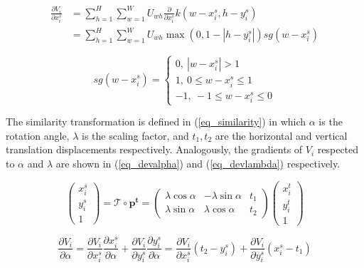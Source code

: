\documentclass[10pt,twocolumn,letterpaper]{article}
\begin{document}
	\begin{equation}\label{eq_devsrc}
	\begin{split}
	\frac{\partial V_i}{\partial x_i^s}
	&= \sum_{h=1}^{H} \sum_{w=1}^{W} U_{wh} \frac{\partial}{\partial x_i^s}k(w-x_i^s,h-y_i^s) \\
	&= \sum_{h=1}^{H} \sum_{w=1}^{W} U_{wh} \max(0,1-|h-y_i^s|) sg(w-x_i^s)
	\end{split}
	\end{equation}
	
	\begin{equation}\label{eq_devsgn}
	sg(w-x_i^s) = 	\left\{                 
	\begin{array}{lll}  
		0, \ |w-x_i^s|>1 \\ 
		1, \ 0 \leq w-x_i^s \leq 1 \\
		-1, \ -1 \leq w-x_i^s \leq 0
	\end{array}       
	\right. 
	\end{equation}

	The similarity transformation is defined in (\ref{eq_similarity}) in which $\alpha$ is the rotation angle, $\lambda$ is the scaling factor, and $t_1,t_2$ are the horizontal and vertical translation displacements respectively. Analogously, the gradients of $V_i$ respected to $\alpha$ and $\lambda$ are shown in (\ref{eq_devalpha}) and (\ref{eq_devlambda}) respectively.
	
	\begin{equation}\label{eq_similarity}
	\left(\begin{matrix}
	x^s_i\\y^s_i\\1
	\end{matrix} \right) = 
	\mathcal{T}\circ \mathbf{p^t} = 
	\left( \begin{matrix}
	\lambda \cos\alpha & -\lambda \sin\alpha & t_1\\
	\lambda \sin\alpha & \lambda \cos\alpha & t_2
	\end{matrix} \right)
	\left(\begin{matrix}
	x^t_i\\y^t_i\\1
	\end{matrix} \right)
	\end{equation}

	\begin{equation}\label{eq_devalpha}
	\frac{\partial V_i}{\partial \alpha} = \frac{\partial V_i}{\partial x_i^s} \frac{\partial x_i^s}{\partial \alpha} + \frac{\partial V_i}{\partial y_i^s} \frac{\partial y_i^s}{\partial \alpha}
	= \frac{\partial V_i}{\partial x_i^s} (t_2-y_i^s) + \frac{\partial V_i}{\partial y_i^s} (x_i^s-t_1)
	\end{equation}
	
\end{document}
